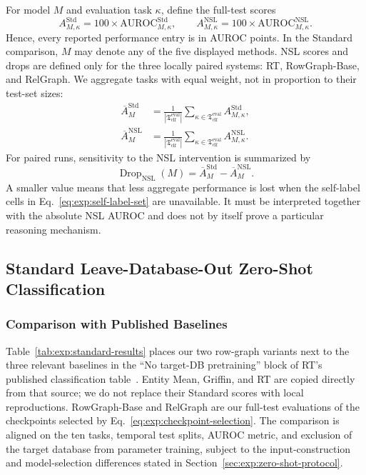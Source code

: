 For model \(M\) and evaluation task \(\kappa\), define the full-test scores
\begin{equation}
  A_{M,\kappa}^{\mathrm{Std}}
  =100\times\mathrm{AUROC}_{M,\kappa}^{\mathrm{Std}},
  \qquad
  A_{M,\kappa}^{\mathrm{NSL}}
  =100\times\mathrm{AUROC}_{M,\kappa}^{\mathrm{NSL}}.
\label{eq:exp:task-auroc}
\end{equation}
Hence, every reported performance entry is in AUROC points. In the Standard
comparison,
\(M\) may denote any of the five displayed methods. NSL scores and drops are
defined only for the three locally paired systems: RT, RowGraph-Base, and
RelGraph. We aggregate tasks with equal weight, not in proportion to their
test-set sizes:
\begin{align}
  \overline A_M^{\mathrm{Std}}
  & =
  \frac{1}{|\mathfrak T_{\mathrm{clf}}^{\mathrm{eval}}|}
  \sum_{\kappa\in\mathfrak T_{\mathrm{clf}}^{\mathrm{eval}}}
  A_{M,\kappa}^{\mathrm{Std}},
  \label{eq:exp:macro-standard}\\
  \overline A_M^{\mathrm{NSL}}
  & =
  \frac{1}{|\mathfrak T_{\mathrm{clf}}^{\mathrm{eval}}|}
  \sum_{\kappa\in\mathfrak T_{\mathrm{clf}}^{\mathrm{eval}}}
  A_{M,\kappa}^{\mathrm{NSL}}.
  \label{eq:exp:macro-nsl}
\end{align}
For paired runs, sensitivity to the NSL intervention is summarized by
\begin{equation}
  \operatorname{Drop}_{\mathrm{NSL}}(M)
  =
  \overline A_M^{\mathrm{Std}}
  -
  \overline A_M^{\mathrm{NSL}}.
\label{eq:exp:self-label-drop}
\end{equation}
A smaller value means that less aggregate performance is lost when the
self-label cells in Eq.~\eqref{eq:exp:self-label-set} are unavailable. It
must be interpreted together with the absolute NSL AUROC and does not by
itself prove a particular reasoning mechanism.

\subsection{Standard Leave-Database-Out Zero-Shot Classification}
\label{sec:exp:standard-results}

\subsubsection{Comparison with Published Baselines}
\label{sec:exp:overall-standard}

Table~\ref{tab:exp:standard-results} places our two row-graph variants next
to the three relevant baselines in the ``No target-DB pretraining''
block of RT's published classification table~\citep{ranjan2026rt}. Entity
Mean, Griffin, and RT are copied directly from that source; we do not replace
their Standard scores with local reproductions. RowGraph-Base and RelGraph
are our full-test evaluations of the checkpoints selected by
Eq.~\eqref{eq:exp:checkpoint-selection}. The comparison is aligned on the
ten tasks, temporal test splits, AUROC metric, and exclusion of the target
database from parameter training, subject to the input-construction and
model-selection differences stated in
Section~\ref{sec:exp:zero-shot-protocol}.

